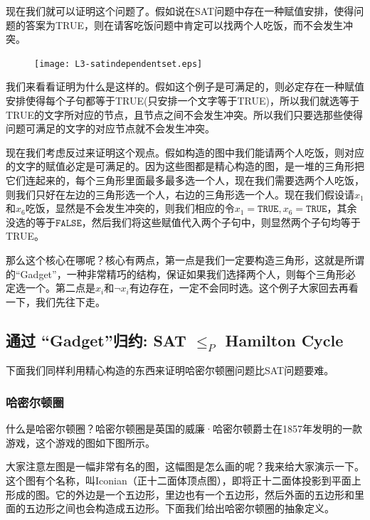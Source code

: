 现在我们就可以证明这个问题了。假如说在SAT问题中存在一种赋值安排，使得问题的答案为TRUE，则在请客吃饭问题中肯定可以找两个人吃饭，而不会发生冲突。

\begin{figure}[H]
\centering
\texttt{[image: L3-satindependentset.eps]}
\end{figure}

我们来看看证明为什么是这样的。假如这个例子是可满足的，则必定存在一种赋值安排使得每个子句都等于TRUE(只安排一个文字等于TRUE)，所以我们就选等于TRUE的文字所对应的节点，且节点之间不会发生冲突。所以我们只要选那些使得问题可满足的文字的对应节点就不会发生冲突。

现在我们考虑反过来证明这个观点。假如构造的图中我们能请两个人吃饭，则对应的文字的赋值必定是可满足的。因为这些图都是精心构造的图，是一堆的三角形把它们连起来的，每个三角形里面最多最多选一个人，现在我们需要选两个人吃饭，则我们只好在左边的三角形选一个人，右边的三角形选一个人。现在我们假设请$x_1$和$x_6$吃饭，显然是不会发生冲突的，则我们相应的令$x_1 = \texttt{TRUE},x_6 = \texttt{TRUE}$，其余没选的等于$\texttt{FALSE}$，然后我们将这些赋值代入两个子句中，则显然两个子句均等于TRUE。

那么这个核心在哪呢？核心有两点，第一点是我们一定要构造三角形，这就是所谓的“Gadget”，一种非常精巧的结构，保证如果我们选择两个人，则每个三角形必定选一个。第二点是$x_i$和$\neg x_i$有边存在，一定不会同时选。这个例子大家回去再看一下，我们先往下走。

\subsection{通过 ``Gadget''归约: {\sc SAT } $\le_P$ {\sc Hamilton Cycle}}

下面我们同样利用精心构造的东西来证明哈密尔顿圈问题比SAT问题要难。

\subsubsection{哈密尔顿圈}

什么是哈密尔顿圈？哈密尔顿圈是英国的威廉·哈密尔顿爵士在1857年发明的一款游戏，这个游戏的图如下图所示。

\begin{figure}[H]
\centering
\end{figure}

大家注意左图是一幅非常有名的图，这幅图是怎么画的呢？我来给大家演示一下。这个图有个名称，叫Iconian（正十二面体顶点图），即将正十二面体投影到平面上形成的图。它的外边是一个五边形，里边也有一个五边形，然后外面的五边形和里面的五边形之间也会构造成五边形。下面我们给出哈密尔顿圈的抽象定义。

